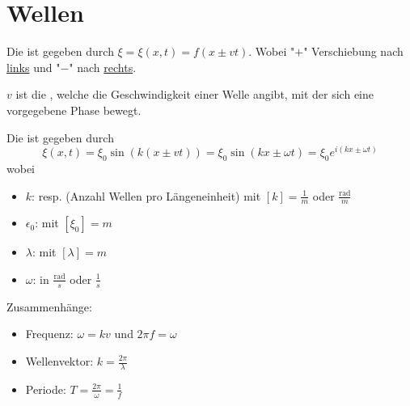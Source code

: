 \section{Wellen}

\vspace{1\baselineskip}

Die  ist gegeben durch $\xi = \xi (x,t) = f(x \pm v t)$.
Wobei "$+$" Verschiebung nach \underline{links} und "$-$" nach \underline{rechts}.

$v$ ist die , welche die Geschwindigkeit einer Welle angibt,
mit der sich eine vorgegebene Phase bewegt.

\vspace{1\baselineskip}

Die  ist gegeben durch
\[
  \xi(x,t) = \xi_0 \sin (k(x \pm vt)) = \xi_0 \sin (kx \pm \omega t) = \xi_0 e^{i (kx \pm \omega t)}
\]
wobei
\begin{itemize}
    \item $k$:  resp.  (Anzahl Wellen pro Längeneinheit) mit $[k]=\frac{1}{m}$ oder $\frac{\text{rad}}{m}$
    \item $\epsilon_0$:  mit $[\xi_0] = m$
    \item $\lambda$:  mit $[\lambda] = m$
    \item $\omega$:  in $\frac{\text{rad}}{s}$ oder $\frac{1}{s}$
\end{itemize}
Zusammenhänge:
\begin{itemize}
    \item Frequenz: $\omega = k v$ und $2 \pi f = \omega$
    \item Wellenvektor: $k = \frac{2 \pi}{\lambda}$
    \item Periode: $T = \frac{2 \pi}{\omega} = \frac{1}{f}$
\end{itemize}

\vspace{1\baselineskip}

